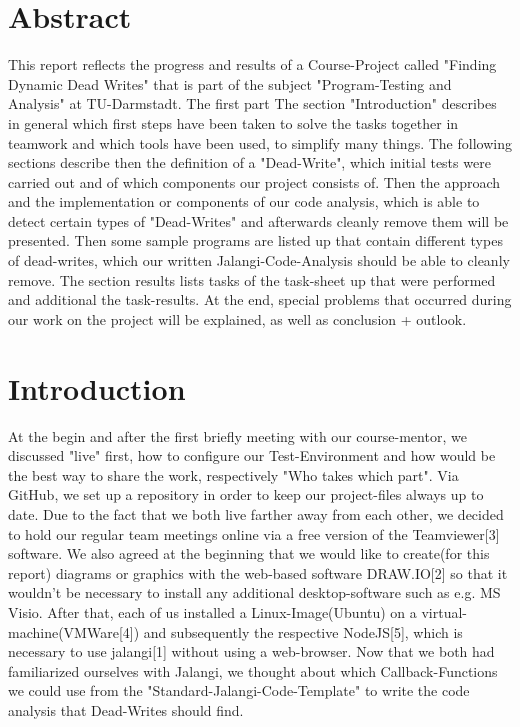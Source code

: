 \documentclass[a4paper]{scrartcl}
\begin{document}
\section{Abstract}
This report reflects the progress and results of a Course-Project called "Finding Dynamic Dead Writes" that is part of the subject "Program-Testing and Analysis" at TU-Darmstadt. The first part  The section "Introduction" describes in general which first steps have been taken to solve the tasks together in teamwork and which tools have been used, to simplify many things. The following sections describe then the definition of a "Dead-Write", which initial tests were carried out and of which components our project consists of. Then the approach and the implementation or components of our code analysis, which is able to detect certain types of "Dead-Writes" and afterwards cleanly remove them will be presented. Then some sample programs are listed up that contain different types of dead-writes, which our written Jalangi-Code-Analysis should be able to cleanly remove. The section results lists tasks of the task-sheet up that were performed and additional the task-results. At the end, special problems that occurred during our work on the project will be explained, as well as conclusion + outlook.
 \section{Introduction}
At the begin and after the first briefly meeting with our course-mentor, we discussed "live" first, how to configure our Test-Environment and how would be the best way to share the work, respectively "Who takes which part". Via GitHub, we set up a repository in order to keep our project-files always up to date. Due to the fact that we both live farther away from each other, we decided to hold our regular team meetings online via a free version of the Teamviewer[3] software. We also agreed at the beginning that we would like to create(for this report) diagrams or graphics with the web-based software DRAW.IO[2] so that it wouldn't be necessary to install any additional desktop-software such as e.g. MS Visio. After that, each of us installed a Linux-Image(Ubuntu) on a virtual-machine(VMWare[4]) and subsequently
the respective NodeJS[5], which is necessary to use jalangi[1] without using a web-browser. Now that we both had familiarized ourselves with Jalangi, we thought about which Callback-Functions we could use from the "Standard-Jalangi-Code-Template" to write the code analysis that Dead-Writes should find.
\end{document}
